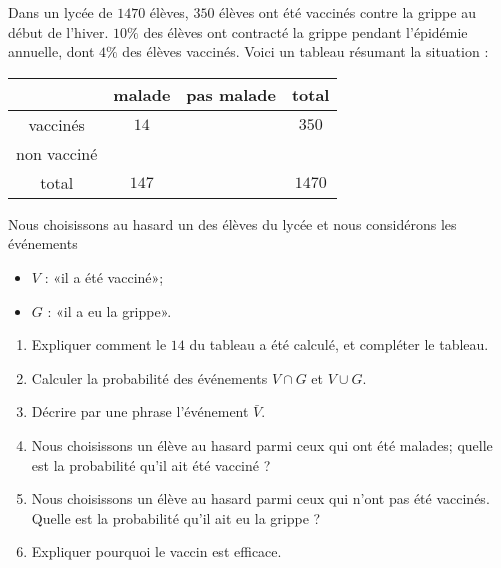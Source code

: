 

\begin{exercice}[\ldots/6]\label{exosmath-0716}

    \begin{multicols}{2}

Dans un lycée de $1470$ élèves, \( 350\) élèves ont été vaccinés contre la grippe au début de l'hiver. \( 10\%\) des élèves ont contracté la grippe pendant l'épidémie annuelle, dont \( 4\%\) des élèves vaccinés. Voici un tableau résumant la situation :

\begin{center}
    \begin{tabular}[]{|c|c|c|c|}
        \hline
        &malade&pas malade&total\\
        \hline
        vaccinés&\( 14\)&&\( 350\)\\
        \hline
        non vacciné&&&\\
        \hline
        total&\( 147\)&&\( 1470\)\\
        \hline
    \end{tabular}
\end{center}

    Nous choisissons au hasard un des élèves du lycée et nous considérons les événements 
    \begin{itemize}
        \item \( V\) : «il a été vacciné»; 
        \item \( G\) : «il a eu la grippe». 
    \end{itemize}
        

\begin{enumerate}
    \item
        Expliquer comment le \( 14\) du tableau a été calculé, et compléter le tableau.
    \item
        Calculer la probabilité des événements \( V\cap G\) et \( V\cup G\).
    \item
        Décrire par une phrase l'événement \( \bar V\).
    \item
        Nous choisissons un élève au hasard parmi ceux qui ont été malades; quelle est la probabilité qu'il ait été vacciné ?
    \item
        Nous choisissons un élève au hasard parmi ceux qui n'ont pas été vaccinés. Quelle est la probabilité qu'il ait eu la grippe ?
    \item
        Expliquer pourquoi le vaccin est efficace.
\end{enumerate}

    \end{multicols}

\end{exercice}
